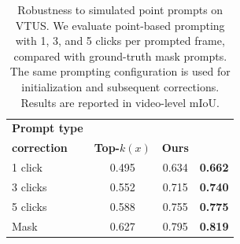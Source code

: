\begin{table}[t]
\centering
\caption{Robustness to simulated point prompts on VTUS.
We evaluate point-based prompting with 1, 3, and 5 clicks
per prompted frame, compared with ground-truth mask prompts.
The same prompting configuration is used for initialization
and subsequent corrections. Results are reported in video-level mIoU.}
\label{tab:vtus_imperfect_corrections}
\small
\begin{tabular}{@{}lccc@{}}
\toprule
\textbf{Prompt type} & \makecell{\textbf{No}\\\textbf{correction}} & \textbf{Top-$k(x)$} & \textbf{Ours} \\
\midrule
1 click & 0.495 & 0.634 & \textbf{0.662} \\
3 clicks & 0.552 & 0.715 & \textbf{0.740} \\
5 clicks & 0.588 & 0.755 & \textbf{0.775} \\
Mask & 0.627 & 0.795 & \textbf{0.819} \\
\bottomrule
\end{tabular}
\end{table}
